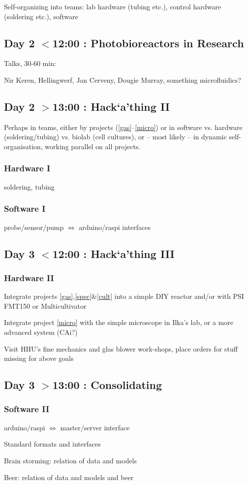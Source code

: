 \documentclass[12pt,a4paper]{article}
\begin{document}
Self-organizing into teams: lab hardware (tubing etc.), control hardware
(soldering etc.), software

\subsection{Day 2 $<$12:00 : Photobioreactors in Research}

Talks, 30-60 min:

Nir Keren, Hellingwerf, Jan Cerveny, Dougie Murray,
something microfluidics?

\subsection{Day 2 $>$13:00 : Hack`a'thing II}

Perhaps in teams, either by projects (\ref{gas}--\ref{micro}) or in
software vs. hardware (soldering/tubing) vs. biolab (cell cultures),
or -- most likely -- in dynamic self-organisation, working parallel on
all projects.

\subsubsection{Hardware I} 
soldering, tubing

\subsubsection{Software I} 
probe/sensor/pump $\Leftrightarrow$ arduino/raspi interfaces

\subsection{Day 3 $<$12:00 : Hack`a'thing III}

\subsubsection{Hardware II} 
Integrate projects \ref{gas},\ref{spec}\&\ref{cult} into a simple DIY
reactor and/or with PSI FMT150 or Multicultivator

Integrate project \ref{micro} with the simple microscope in Ilka's lab,
or a more advanced system (CAi?)

Visit HHU's fine mechanics and glas blower work-shops, place orders 
for stuff missing for above goals


\subsection{Day 3 $>$13:00 : Consolidating}

\subsubsection{Software II}
arduino/raspi $\Leftrightarrow$  master/server interface

Standard formats and interfaces

Brain storming: relation of data and models

Beer: relation of data and models and beer
\end{document}
